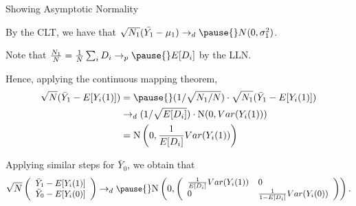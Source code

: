 \documentclass[11pt,english,handout]{beamer}
\newenvironment{wideitemize}{\itemize\addtolength{\itemsep}{10pt}}{\enditemize}
\begin{document}
\begin{frame}{Showing Asymptotic Normality}

\begin{wideitemize}
\item
By the CLT, we have that $\sqrt{N_1} (\bar{Y_1} - \mu_1) \rightarrow_d \pause{} N(0,\sigma_1^2)$.  \pause
	
\item
Note that $\frac{N_1}{N} = \frac{1}{N} \sum_i D_i \rightarrow_p \pause{} E[D_i]$ by the LLN.

\pause
\item
Hence, applying the continuous mapping theorem,
\begin{align*}
\sqrt{N}(\bar{Y}_1 - E[Y_i(1)]) &= \pause{} (1/\sqrt{N_1/N}) \cdot \sqrt{N_1} (\bar{Y}_1 - E[Y_i(1)])\\ 
&\rightarrow_d (1/\sqrt{E[D_i]}) \cdot \mathrm{N}(0,Var(Y_i(1))) \\
& = \mathrm{N}\left(0, \frac{1}{E[D_i]} Var(Y_i(1)) \right)
\end{align*}

\pause
\item
Applying similar steps for $\bar{Y}_0$, we obtain that \pause
	$$\small \sqrt{N} \left(   \begin{array}{c}  \bar{Y}_1 - E[Y_i(1)] \\ 
	  \bar{Y}_0 - E[Y_i(0)] 
\end{array}  \right) \rightarrow_d \pause{} \mathrm{N}\left(0 , \left(\begin{array}{ll} \frac{1}{E[D_i]} Var(Y_i(1)) & 0 \\ 0 & \frac{1}{1-E[D_i]} Var(Y_i(0)) \end{array} \right) \right).$$

\end{wideitemize}
\end{frame}
\end{document}
